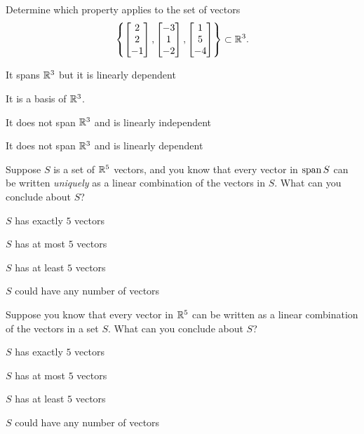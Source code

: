 \begin{readinessAssuranceTest}
\item Determine which property applies to the set of vectors $$\left\{ \begin{bmatrix}  2 \\ 2 \\ -1 \end{bmatrix}, \begin{bmatrix} -3 \\ 1 \\ -2 \end{bmatrix} , \begin{bmatrix} 1 \\ 5 \\ -4 \end{bmatrix}\right\}\subset \mathbb{R}^3.$$
\begin{readinessAssuranceTestChoices}
\item It spans \(\mathbb{R}^3\) but it is linearly dependent
\item It is a basis of $\mathbb{R}^3$.
\item It does not span \(\mathbb{R}^3\) and is linearly independent
\item It does not span \(\mathbb{R}^3\) and is linearly dependent %
\end{readinessAssuranceTestChoices}


\item Suppose \(S\) is a set of \(\mathbb{R}^5\) vectors, and you know that every vector in
      \(\operatorname{span} S\) can be written \textit{uniquely} as a linear combination of the vectors
      in \(S\).  What can you conclude about \(S\)?
\begin{readinessAssuranceTestChoices}
\item \(S\) has exactly \(5\) vectors
\item \(S\) has at most \(5\) vectors
\item \(S\) has at least \(5\) vectors
\item \(S\) could have any number of vectors
\end{readinessAssuranceTestChoices}

\item Suppose you know that every vector in \(\mathbb{R}^5\) can be written as a linear combination of 
      the vectors in a set \(S\).  What can you conclude about \(S\)?
\begin{readinessAssuranceTestChoices}
\item \(S\) has exactly \(5\) vectors
\item \(S\) has at most \(5\) vectors
\item \(S\) has at least \(5\) vectors
\item \(S\) could have any number of vectors
\end{readinessAssuranceTestChoices}


\end{readinessAssuranceTest}
